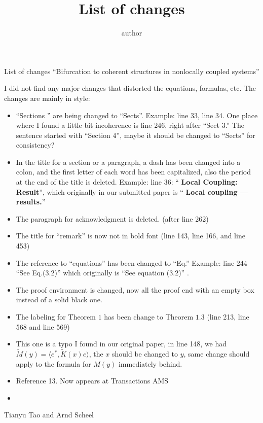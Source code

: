 \documentclass[letterpaper,11pt]{article}
\title{List of changes}
\author{author}
\numberwithin{equation}{section}
\theoremstyle{plain}
\begin{document}
List of changes 
``Bifurcation to coherent structures in nonlocally coupled systems''

I did not find any major changes that distorted the equations, formulas, etc. The changes are mainly in style:

\begin{itemize}

\item ``Sections '' are being changed to ``Sects''. Example: line 33, line 34. One place where I found a little bit incoherence is line 246, right after ``Sect 3.'' The sentence started with ``Section 4'', maybe it should be changed to ``Sects'' for consistency?

\item In the title for a section or a paragraph, a dash has been changed into a colon, and the first letter of each word has been capitalized, also the period at the end of the title is deleted. Example: line 36: ``\textbf{ Local Coupling: Result}'', which originally in our submitted paper is ``\textbf{ Local coupling --- results.}''


\item The paragraph for acknowledgment is deleted. (after line 262)

\item The title for ``remark'' is now not in bold font (line 143, line 166, and line 453)

\item The reference to ``equations'' has been changed to ``Eq.'' Example: line 244 ``See Eq.(3.2)'' which originally is ``See equation (3.2)'' .

\item The proof environment is changed, now all the proof end with an empty box instead of a solid black one.

\item The labeling for Theorem $1$ has been change to Theorem $1.3$ (line 213, line 568 and line 569)


\item This one is a typo I found in our original paper, in line 148, we had $\tilde{M}(y) = \langle e^*, \tilde{K}(x)e\rangle$, the $x$ should be changed to $y$, same change should apply to the formula for $M(y)$ immediately behind.

\item Reference 13. Now appears at Transactions AMS

\item
 \end{itemize}

Tianyu Tao and Arnd Scheel
\end{document}
